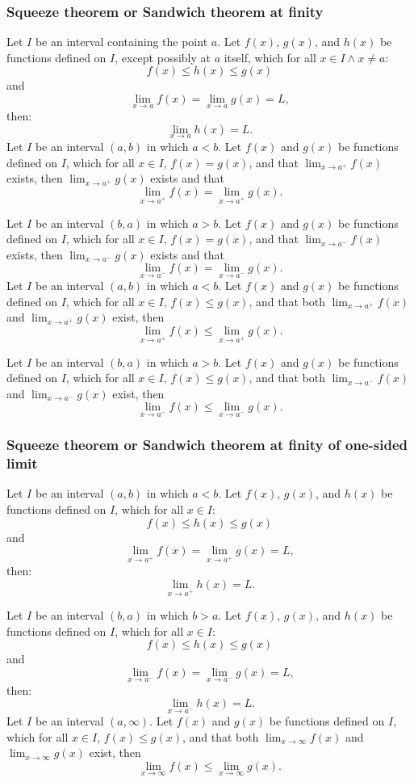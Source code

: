 \documentclass[a4paper,12pt]{report}
\begin{document}
\subsubsection{Squeeze theorem or Sandwich theorem at finity}
Let \(I\) be an interval containing the point \(a\). Let $f(x)$, $g(x)$, and $h(x)$ be functions defined on \(I\), except possibly at \(a\) itself, which for all $x\in I\land x\neq a$:
\[f(x)\leq h(x)\leq g(x)\]
and
\[\lim_{x\to a}f(x)=\lim_{x\to a}g(x)=L,\]
then: 
\[\lim_{x\to a}h(x)=L.\]
Let \(I\) be an interval \((a,b)\) in which $a<b$. Let $f(x)$ and $g(x)$ be functions defined on \(I\), which for all $x\in I$, $f(x)=g(x)$, and that $\lim_{x\to a^+}f(x)$ exists, then $\lim_{x\to a^+}g(x)$ exists and that
\[\lim_{x\to a^+}f(x)=\lim_{x\to a^+}g(x).\]

Let \(I\) be an interval \((b,a)\) in which $a>b$. Let $f(x)$ and $g(x)$ be functions defined on \(I\), which for all $x\in I$, $f(x)=g(x)$, and that $\lim_{x\to a^-}f(x)$ exists, then $\lim_{x\to a^-}g(x)$ exists and that
\[\lim_{x\to a^-}f(x)=\lim_{x\to a^-}g(x).\]
Let \(I\) be an interval \((a,b)\) in which $a<b$. Let $f(x)$ and $g(x)$ be functions defined on \(I\), which for all $x\in I$, $f(x)\leq g(x)$, and that both $\lim_{x\to a^+}f(x)$ and $\lim_{x\to a^+}g(x)$ exist, then
\[\lim_{x\to a^+}f(x)\leq\lim_{x\to a^+}g(x).\]

Let \(I\) be an interval \((b,a)\) in which $a>b$. Let $f(x)$ and $g(x)$ be functions defined on \(I\), which for all $x\in I$, $f(x)\leq g(x)$, and that both $\lim_{x\to a^-}f(x)$ and $\lim_{x\to a^-}g(x)$ exist, then
\[\lim_{x\to a^-}f(x)\leq\lim_{x\to a^-}g(x).\]
\subsubsection{Squeeze theorem or Sandwich theorem at finity of one-sided limit}
Let \(I\) be an interval \((a,b)\) in which $a<b$. Let $f(x)$, $g(x)$, and $h(x)$ be functions defined on \(I\), which for all $x\in I$:
\[f(x)\leq h(x)\leq g(x)\]
and
\[\lim_{x\to a^+}f(x)=\lim_{x\to a^+}g(x)=L,\]
then: 
\[\lim_{x\to a^+}h(x)=L.\]

Let \(I\) be an interval \((b,a)\) in which $b>a$. Let $f(x)$, $g(x)$, and $h(x)$ be functions defined on \(I\), which for all $x\in I$:
\[f(x)\leq h(x)\leq g(x)\]
and
\[\lim_{x\to a^-}f(x)=\lim_{x\to a^-}g(x)=L,\]
then: 
\[\lim_{x\to a^-}h(x)=L.\]
Let \(I\) be an interval $(a,\infty)$. Let $f(x)$ and $g(x)$ be functions defined on \(I\), which for all $x\in I$, $f(x)\leq g(x)$, and that both $\lim_{x\to\infty}f(x)$ and $\lim_{x\to\infty}g(x)$ exist, then
\[\lim_{x\to\infty}f(x)\leq\lim_{x\to\infty}g(x).\]
\end{document}
